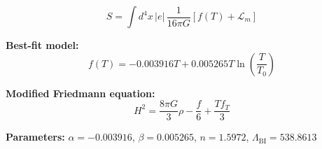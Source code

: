
\begin{equation}
  S = \int d^4x \, |e| \, \frac{1}{16\pi G} \left[ f(T) + \mathcal{L}_m \right]
\end{equation}

\textbf{Best-fit model:}
\begin{equation}
  f(T) = -0.003916 T + 0.005265 T \ln\!\left(\frac{T}{T_0}\right)
\end{equation}

\textbf{Modified Friedmann equation:}
\begin{equation}
  H^2 = \frac{8\pi G}{3} \rho - \frac{f}{6} + \frac{T f_T}{3}
\end{equation}

\textbf{Parameters:}
$\alpha = -0.003916$, \quad
$\beta = 0.005265$, \quad
$n = 1.5972$, \quad
$\Lambda_{\text{BI}} = 538.8613$